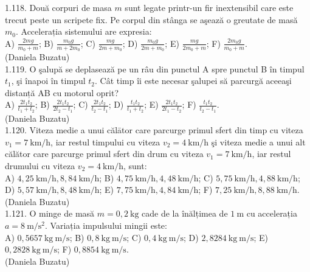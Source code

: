 1.118. Două corpuri de masa $m$ sunt legate printr-un fir inextensibil care este trecut peste un scripete fix. Pe corpul din stânga se aşează o greutate de masă $m_{0}$. Accelerația sistemului are expresia:\\ A) $\frac{2 m g}{m_{0}+m}$; B) $\frac{m_{0} g}{m+2 m_{0}}$; C) $\frac{m g}{2 m+m_{0}}$; D) $\frac{m_{0} g}{2 m+m_{0}}$; E) $\frac{m g}{2 m_{0}+m}$; F) $\frac{2 m_{0} g}{m_{0}+m}$.\\ (Daniela Buzatu)\\

1.119. O şalupă se deplasează pe un râu din punctul A spre punctul B în timpul $t_{1}$, şi înapoi în timpul $t_{2}$. Cât timp îi este necesar şalupei să parcurgă aceeaşi distanță AB cu motorul oprit?\\ A) $\frac{2 t_{1} t_{2}}{t_{1}+t_{2}}$; B) $\frac{2 t_{1} t_{2}}{2 t_{2}-t_{1}}$; C) $\frac{2 t_{1} t_{2}}{t_{2}-t_{1}}$; D) $\frac{t_{1} t_{2}}{t_{1}+t_{2}}$; E) $\frac{2 t_{1} t_{2}}{2 t_{1}-t_{2}}$; F) $\frac{t_{1} t_{2}}{t_{2}-t_{1}}$.\\ (Daniela Buzatu)\\

1.120. Viteza medie a unui călātor care parcurge primul sfert din timp cu viteza $v_{1}=7 \mathrm{~km} / \mathrm{h}$, iar restul timpului cu viteza $v_{2}=4 \mathrm{~km} / \mathrm{h}$ şi viteza medie a unui alt călător care parcurge primul sfert din drum cu viteza $v_{1}=7 \mathrm{~km} / \mathrm{h}$, iar restul drumului cu viteza $v_{2}=4 \mathrm{~km} / \mathrm{h}$, sunt:\\ A) $4,25 \mathrm{~km} / \mathrm{h}, 8,84 \mathrm{~km} / \mathrm{h}$; B) $4,75 \mathrm{~km} / \mathrm{h}, 4,48 \mathrm{~km} / \mathrm{h}$; C) $5,75 \mathrm{~km} / \mathrm{h}, 4,88 \mathrm{~km} / \mathrm{h}$; D) $5,57 \mathrm{~km} / \mathrm{h}, 8,48 \mathrm{~km} / \mathrm{h}$; E) $7,75 \mathrm{~km} / \mathrm{h}, 4,84 \mathrm{~km} / \mathrm{h}$; F) $7,25 \mathrm{~km} / \mathrm{h}, 8,88 \mathrm{~km} / \mathrm{h}$.\\ (Daniela Buzatu)\\

1.121. O minge de masă $m=0,2 \mathrm{~kg}$ cade de la înălțimea de $1 \mathrm{~m}$ cu accelerația $a=8 \mathrm{~m} / \mathrm{s}^{2}$. Variația impulsului mingii este:\\ A) $0,5657 \mathrm{~kg} \mathrm{~m} / \mathrm{s}$; B) $0,8 \mathrm{~kg} \mathrm{~m} / \mathrm{s}$; C) $0,4 \mathrm{~kg} \mathrm{~m} / \mathrm{s}$; D) $2,8284 \mathrm{~kg} \mathrm{~m} / \mathrm{s}$; E) $0,2828 \mathrm{~kg} \mathrm{~m} / \mathrm{s}$; F) $0,8854 \mathrm{~kg} \mathrm{~m} / \mathrm{s}$.\\ (Daniela Buzatu)\\

